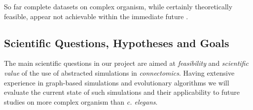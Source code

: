 \documentclass[a4paper,11pt]{article}
\begin{document}
So far complete datasets on complex organism, while certainly theoretically feasible, appear not achievable within the immediate future \citep{Gjorgjieva2014} \citep{Mikula2016}.


\subsection{Scientific Questions, Hypotheses and Goals}

The main scientific questions in our project are aimed at \emph{feasibility} and \emph{scientific value} of the use of abstracted simulations in \emph {connectomics}. Having extensive experience in graph-based simulations and evolutionary algorithms we will evaluate the current state of such simulations and their applicability to future studies on more complex organism than \emph{c. elegans}.
\end{document}
